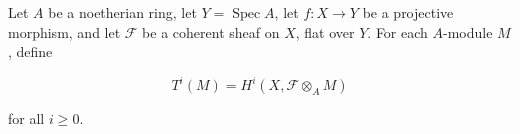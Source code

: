 Let $A$ be a noetherian ring, let $Y = \operatorname{Spec} A$, let $f: X \to Y$ be a projective morphism, and let $\mathcal{F}$ be a coherent sheaf on $X$, flat over $Y$. For each $A$-module $M$, define

$$T^i(M) = H^i(X, \mathcal{F} \otimes_A M)$$

for all $i \geqslant 0$.
